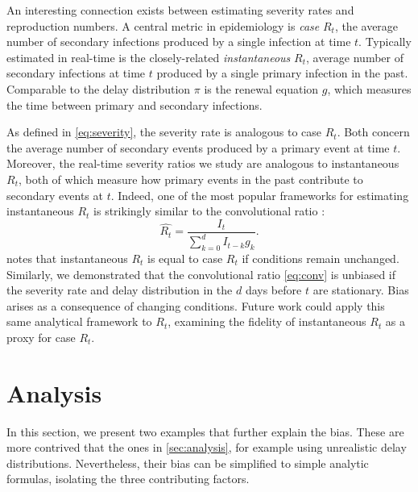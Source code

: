 \documentclass{article}
\begin{document}
An interesting connection exists between estimating severity rates and reproduction numbers. A central metric in epidemiology is \textit{case} $R_t$, the average number of secondary infections produced by a single infection at time $t$. Typically estimated in real-time is the closely-related \textit{instantaneous} $R_t$, average number of secondary infections at time $t$ produced by a single primary infection in the past. Comparable to the delay distribution $\pi$ is the renewal equation $g$, which measures the time between primary and secondary infections.

As defined in \ref{eq:severity}, the severity rate is analogous to case $R_t$. Both concern the average number of secondary events produced by a primary event at time $t$. Moreover, the real-time severity ratios we study are analogous to instantaneous $R_t$, both of which measure how primary events in the past contribute to secondary events at $t$. Indeed, one of the most popular frameworks for estimating instantaneous $R_t$ is strikingly similar to the convolutional ratio \cite{fraser2007,wallinga2007how,cori2013new}:
\begin{equation}\label{eq:instRt}
    \hat{R_t} = \frac{I_t}{\sum_{k=0}^d I_{t-k}g_k}.
\end{equation}
\citeauthor{fraser2007} notes that instantaneous $R_t$ is equal to case $R_t$ if conditions remain unchanged. Similarly, we demonstrated that the convolutional ratio \ref{eq:conv} is unbiased if the severity rate and delay distribution in the $d$ days before $t$ are stationary. Bias arises as a consequence of changing conditions. Future work could apply this same analytical framework to $R_t$, examining the fidelity of instantaneous $R_t$ as a proxy for case $R_t$. 





\pagebreak
\appendix
\section{Analysis}\label{apx:analysis}

In this section, we present two examples that further explain the bias. These are more contrived that the ones in \ref{sec:analysis}, for example using unrealistic delay distributions. Nevertheless, their bias can be simplified to simple analytic formulas, isolating the three contributing factors.
\end{document}
